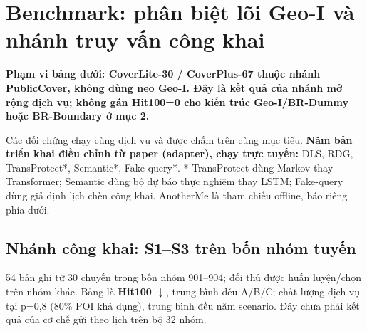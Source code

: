 \documentclass[10pt,a4paper]{article}
\newcommand{\key}[1]{\par\smallskip\noindent\colorbox{pale}{\parbox{\dimexpr\linewidth-2\fboxsep}{\textbf{#1}}}\par\smallskip}
\begin{document}
\clearpage
\section{Benchmark: phân biệt lõi Geo-I và nhánh truy vấn công khai}\label{sec:3}
\key{Phạm vi bảng dưới: CoverLite-30 / CoverPlus-67 thuộc nhánh PublicCover, không dùng neo Geo-I. Đây là kết quả của nhánh mở rộng dịch vụ; không gán Hit100=0 cho kiến trúc Geo-I/BR-Dummy hoặc BR-Boundary ở mục 2.}

Các đối chứng chạy cùng dịch vụ và được chấm trên cùng mục tiêu. \textbf{Năm bản triển khai điều chỉnh từ paper (adapter), chạy trực tuyến:} DLS, RDG, TransProtect*, Semantic*, Fake-query*. * TransProtect dùng Markov thay Transformer; Semantic dùng bộ dự báo thực nghiệm thay LSTM; Fake-query dùng giả định lịch chèn công khai. AnotherMe là tham chiếu offline, báo riêng phía dưới.

\subsection{Nhánh công khai: S1–S3 trên bốn nhóm tuyến}\label{sub:3.1}
54 bản ghi từ 30 chuyến trong bốn nhóm 901–904; đối thủ được huấn luyện/chọn trên nhóm khác. Bảng là \textbf{Hit100 $\downarrow$}, trung bình đều A/B/C; chất lượng dịch vụ tại p=0,8 (80\% POI khả dụng), trung bình đều năm scenario. Đây chưa phải kết quả của cơ chế gửi theo lịch trên bộ 32 nhóm.
\end{document}
